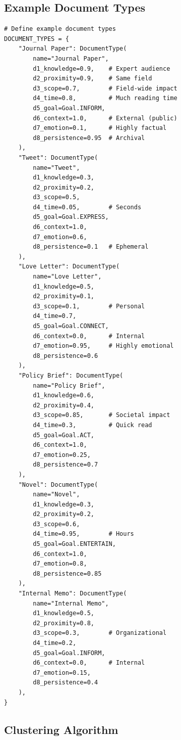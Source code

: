 \subsection{Example Document Types}

\begin{verbatim}
# Define example document types
DOCUMENT_TYPES = {
    "Journal Paper": DocumentType(
        name="Journal Paper",
        d1_knowledge=0.9,    # Expert audience
        d2_proximity=0.9,    # Same field
        d3_scope=0.7,        # Field-wide impact
        d4_time=0.8,         # Much reading time
        d5_goal=Goal.INFORM,
        d6_context=1.0,      # External (public)
        d7_emotion=0.1,      # Highly factual
        d8_persistence=0.95  # Archival
    ),
    "Tweet": DocumentType(
        name="Tweet",
        d1_knowledge=0.3,
        d2_proximity=0.2,
        d3_scope=0.5,
        d4_time=0.05,        # Seconds
        d5_goal=Goal.EXPRESS,
        d6_context=1.0,
        d7_emotion=0.6,
        d8_persistence=0.1   # Ephemeral
    ),
    "Love Letter": DocumentType(
        name="Love Letter",
        d1_knowledge=0.5,
        d2_proximity=0.1,
        d3_scope=0.1,        # Personal
        d4_time=0.7,
        d5_goal=Goal.CONNECT,
        d6_context=0.0,      # Internal
        d7_emotion=0.95,     # Highly emotional
        d8_persistence=0.6
    ),
    "Policy Brief": DocumentType(
        name="Policy Brief",
        d1_knowledge=0.6,
        d2_proximity=0.4,
        d3_scope=0.85,       # Societal impact
        d4_time=0.3,         # Quick read
        d5_goal=Goal.ACT,
        d6_context=1.0,
        d7_emotion=0.25,
        d8_persistence=0.7
    ),
    "Novel": DocumentType(
        name="Novel",
        d1_knowledge=0.3,
        d2_proximity=0.2,
        d3_scope=0.6,
        d4_time=0.95,        # Hours
        d5_goal=Goal.ENTERTAIN,
        d6_context=1.0,
        d7_emotion=0.8,
        d8_persistence=0.85
    ),
    "Internal Memo": DocumentType(
        name="Internal Memo",
        d1_knowledge=0.5,
        d2_proximity=0.8,
        d3_scope=0.3,        # Organizational
        d4_time=0.2,
        d5_goal=Goal.INFORM,
        d6_context=0.0,      # Internal
        d7_emotion=0.15,
        d8_persistence=0.4
    ),
}
\end{verbatim}

\subsection{Clustering Algorithm}

